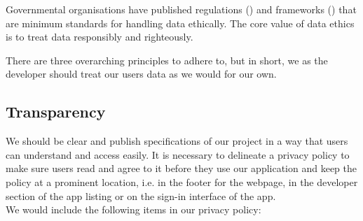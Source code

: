 Governmental organisations have published regulations (\cite{EUdataregulations2018}) and frameworks
(\cite{framework}) that are minimum standards for handling data ethically. The core value of data ethics 
is to treat data responsibly and righteously.

There are three overarching principles to adhere to, but in short, we as the developer should treat our 
users\textsc{} data as we would for our own.

\subsection{Transparency}
We should be clear and publish specifications of our project in a way that users can understand and access
easily. It is necessary to delineate a privacy policy to make sure users read and agree to it before they use
our application and keep the policy at a prominent location, i.e. in the footer for the webpage, in the developer
section of the app listing or on the sign-in interface of the app.\\We would include the following items in our privacy policy:
